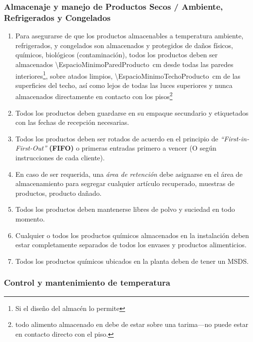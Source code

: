 \subsubsection{Almacenaje y manejo de Productos Secos / Ambiente, Refrigerados y Congelados}
\begin{enumerate}
	\item Para asegurarse de que los productos almacenables a temperatura ambiente, refrigerados, y congelados son almacenados y protegidos de daños físicos, químicos, biológicos (contaminación), todos los productos deben ser almacenados \qty{\EspacioMinimoParedProducto}{\centi\meter} desde todas las paredes interiores\footnote{Si el diseño del almacén lo permite}, sobre atados limpios, \qty{\EspacioMinimoTechoProducto}{\centi\meter} de las superficies del techo, así como lejos de todas las luces superiores y nunca almacenados directamente en contacto con los pisos\footnote{todo \gls{alimento} almacenado en  debe de estar sobre una tarima---no puede estar en contacto directo con el piso.}
	\item Todos los productos deben guardarse en su empaque secundario y etiquetados con las fechas de recepción necesarias.
	\item Todos los productos deben ser rotados de acuerdo en el principio de \textit{“First-in-First-Out”} \textbf{(FIFO)} o primeras entradas primero a vencer (O según instrucciones de cada cliente).
	\item En caso de ser requerida, una \emph{área de retención} debe asignarse en el área de almacenamiento para segregar cualquier artículo recuperado, muestras de productos, producto dañado. 
	\item Todos los productos deben mantenerse libres de polvo y suciedad en todo momento.
	\item Cualquier o todos los productos químicos almacenados en la instalación deben estar completamente separados de todos los envases y productos alimenticios.
	\item Todos los productos químicos ubicados en la planta deben de tener un MSDS.
\end{enumerate}

\subsubsection{Control y mantenimiento de temperatura}


